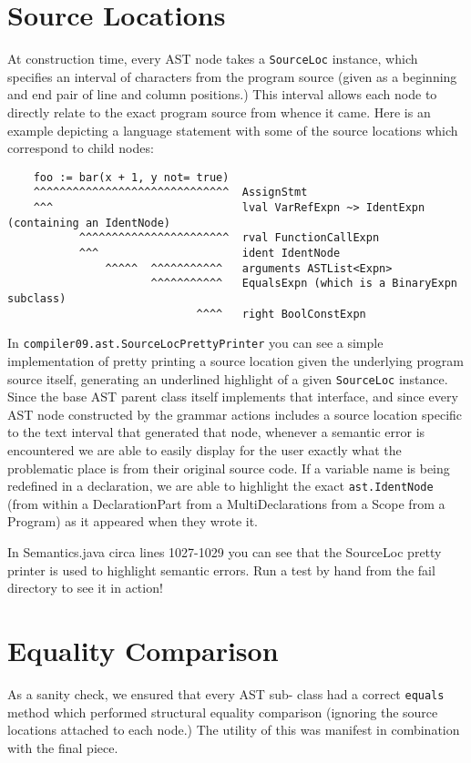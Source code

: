 \documentclass[oneside]{amsart}
\theoremstyle{definition}
\theoremstyle{remark}
\numberwithin{equation}{section}
\begin{document}
\section{Source Locations}
At construction time, every AST node takes a \texttt{SourceLoc} instance, which
specifies an interval of characters from the program source (given as a
beginning and end pair of line and column positions.) This interval allows each
node to directly relate to the exact program source from whence it came. Here
is an example depicting a language statement with some of the source locations
which correspond to child nodes:

\begin{lstlisting}
    foo := bar(x + 1, y not= true)
    ^^^^^^^^^^^^^^^^^^^^^^^^^^^^^^  AssignStmt
    ^^^                             lval VarRefExpn ~> IdentExpn (containing an IdentNode)
           ^^^^^^^^^^^^^^^^^^^^^^^  rval FunctionCallExpn
           ^^^                      ident IdentNode
               ^^^^^  ^^^^^^^^^^^   arguments ASTList<Expn>
                      ^^^^^^^^^^^   EqualsExpn (which is a BinaryExpn subclass)
                             ^^^^   right BoolConstExpn
\end{lstlisting}

In \texttt{compiler09.ast.SourceLocPrettyPrinter} you can see a simple
implementation of pretty printing a source location given the underlying program
source itself, generating an underlined highlight of a given \texttt{SourceLoc}
instance. Since the base AST parent class itself implements that interface, and
since every AST node constructed by the grammar actions includes a source
location specific to the text interval that generated that node, whenever a
semantic error is encountered we are able to easily display for the user exactly
what the problematic place is from their original source code. If a variable
name is being redefined in a declaration, we are able to highlight the exact
\texttt{ast.IdentNode} (from within a DeclarationPart from a MultiDeclarations
from a Scope from a Program) as it appeared when they wrote it.

In Semantics.java circa lines 1027-1029 you can see that the SourceLoc pretty
printer is used to highlight semantic errors. Run a test by hand from the
fail directory to see it in action!

\section{Equality Comparison}
As a sanity check, we ensured that every AST sub- class had a correct
\texttt{equals} method which performed structural equality comparison (ignoring
the source locations attached to each node.) The utility of this was manifest in
combination with the final piece.
\end{document}
